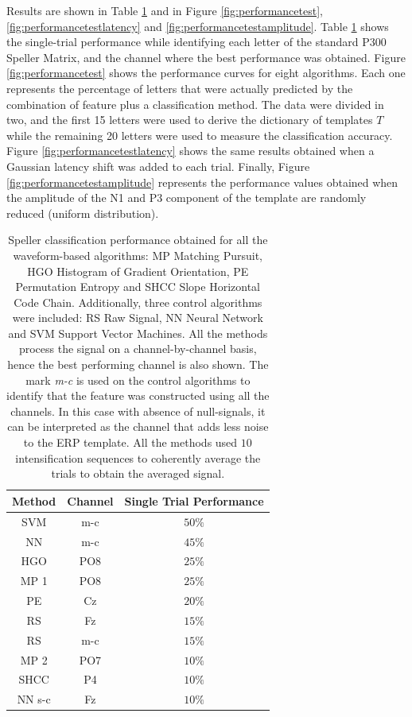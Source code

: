 \documentclass[brainsci,article,submit,moreauthors,pdftex,10pt,a4paper]{mdpi}
\begin{document}
Results are shown in Table \ref{tab:results} and in Figure \ref{fig:performancetest},\ref{fig:performancetestlatency} and \ref{fig:performancetestamplitude}.  Table \ref{tab:results} shows the single-trial performance while identifying each letter of the standard P300 Speller Matrix, and the channel where the best performance was obtained.   Figure \ref{fig:performancetest} shows the performance curves for eight algorithms.  Each one represents the percentage of letters that were actually predicted by the combination of feature plus a classification method.  The data were divided in two, and the first 15 letters were used to derive the dictionary of templates $T$ while the remaining 20 letters were used to measure the classification accuracy.   Figure \ref{fig:performancetestlatency} shows the same results obtained when a Gaussian latency shift was added to each trial.   Finally, Figure \ref{fig:performancetestamplitude} represents the performance values obtained when the amplitude of the N1 and P3 component of the template are randomly reduced (uniform distribution).


\begin{table}[H]
\caption{Speller classification performance obtained for all the waveform-based algorithms: MP Matching Pursuit, HGO Histogram of Gradient Orientation, PE Permutation Entropy and SHCC Slope Horizontal Code Chain. Additionally, three control algorithms were included: RS Raw Signal, NN Neural Network and SVM Support Vector Machines.  All the methods process the signal on a channel-by-channel basis, hence the best performing channel is also shown. The mark \textit{m-c} is used on the control algorithms to identify that the feature was constructed using all the channels.  In this case with absence of null-signals, it can be interpreted as the channel that adds less noise to the ERP template. All the methods used $10$ intensification sequences to coherently average the trials to obtain the averaged signal. }
\centering
\begin{tabular}{ccc}
\toprule
\textbf{Method}	& \textbf{Channel} & \textbf{Single Trial Performance}	\\
\midrule
SVM     & m-c  & $50\%$ \\
NN       & m-c  & $45\%$ \\
HGO  & PO8 & $25\%$ \\
MP 1 & PO8 & $25\%$ \\
PE     & Cz & $20\%$ \\
RS     & Fz & $15\%$ \\
RS     & m-c  & $15\%$ \\
MP 2 & PO7 & $10\%$ \\
SHCC & P4 & $10\%$ \\
NN s-c & Fz & $10\%$ \\
\bottomrule
\end{tabular}
\label{tab:results}
\end{table}
\end{document}
